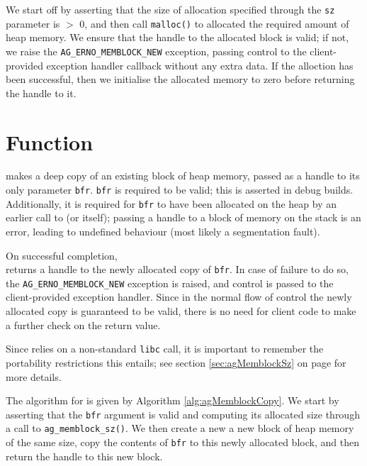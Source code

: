 We start off by asserting that the size of allocation specified through the
\verb|sz| parameter is $>$ 0, and then call \verb|malloc()| to allocated the
required amount of heap memory. We ensure that the handle to the allocated block
is valid; if not, we raise the \verb|AG_ERNO_MEMBLOCK_NEW| exception, passing
control to the client-provided exception handler callback without any extra
data. If the alloction has been successful, then we initialise the allocated
memory to zero before returning the handle to it.


%
%
\section{Function \agMemblockCopy}

\agMemblockCopy makes a deep copy of an existing block of heap memory, passed as
a handle to its only parameter \verb|bfr|. \verb|bfr| is required to be valid;
this is asserted in debug builds. Additionally, it is required for \verb|bfr| to
have been allocated on the heap by an earlier call to \agMemblockNew (or 
\agMemblockCopy itself); passing a handle to a block of memory on the stack is
an error, leading to undefined behaviour (most likely a segmentation fault).


On successful completion, \agMemblockCopy \\ returns a handle to the newly 
allocated copy of \verb|bfr|. In case of failure to do so, the 
\verb|AG_ERNO_MEMBLOCK_NEW| exception is raised, and control is passed to the 
client-provided exception handler. Since in the normal flow of control the newly
allocated copy is guaranteed to be valid, there is no need for client code to 
make a further check on the return value.

Since \agMemblockCopy relies on a non-standard \verb|libc| call, it is 
important to remember the portability restrictions this entails; see section
\ref{sec:agMemblockSz} on page \pageref{sec:agMemblockSz} for more details.

The algorithm for \agMemblockCopy is given by Algorithm
\ref{alg:agMemblockCopy}. We start by asserting that the \verb|bfr| argument is
valid and computing its allocated size through a call to
\verb|ag_memblock_sz()|. We then create a new a new block of heap memory of the
same size, copy the contents of \verb|bfr| to this newly allocated block, and
then return the handle to this new block.


